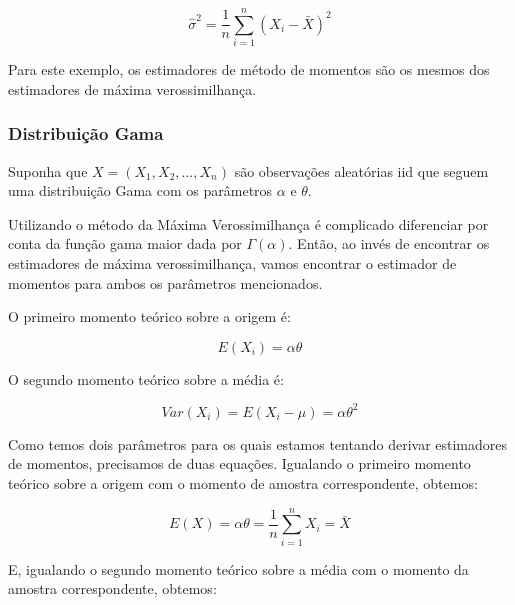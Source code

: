\begin{equation}
	\hat{\sigma}^2=\dfrac{1}{n}\sum\limits_{i=1}^n( X_i-\bar{X})^2
\end{equation}

Para este exemplo, os estimadores de método de momentos são os mesmos dos estimadores de máxima verossimilhança.

\subsubsection{Distribuição Gama}

Suponha que \begin{math} X = (X_1, X_2, ..., X_n) \end{math} são observações aleatórias iid que seguem uma distribuição Gama com os parâmetros \begin{math} \alpha \end{math} e \begin{math} \theta \end{math}.

Utilizando o método da Máxima Verossimilhança é complicado diferenciar por conta da função gama maior dada por \begin{math} \Gamma(\alpha) \end{math}. Então, ao invés de encontrar os estimadores de máxima verossimilhança, vamos encontrar o estimador de momentos para ambos os parâmetros mencionados.

O primeiro momento teórico sobre a origem é: 

\begin{equation}
	E(X_i) = \alpha\theta
\end{equation}

O segundo momento teórico sobre a média é: 

\begin{equation}
	Var(X_i) = E(X_i - \mu) = \alpha\theta^2
\end{equation}

Como temos dois parâmetros para os quais estamos tentando derivar estimadores de momentos, precisamos de duas equações. Igualando o primeiro momento teórico sobre a origem com o momento de amostra correspondente, obtemos:

\begin{equation}
	E(X)=\alpha\theta=\dfrac{1}{n}\sum\limits_{i=1}^n X_i=\bar{X}
\end{equation}

E, igualando o segundo momento teórico sobre a média com o momento da amostra correspondente, obtemos:

